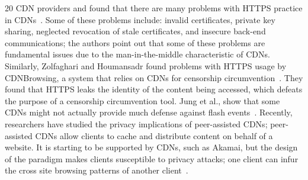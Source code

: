 20 CDN providers and found that there are many problems with HTTPS practice in CDNs~\cite{liang2014https}.  Some of these 
problems include: invalid certificates, private key sharing, neglected revocation of stale certificates, and 
insecure back-end communications; the authors point out that some of these problems are fundamental issues due to 
the man-in-the-middle characteristic of CDNs.  Similarly, Zolfaghari and Houmansadr found problems with HTTPS usage by 
CDNBrowsing, a system that relies on CDNs for censorship circumvention~\cite{zolfaghari2016practical}.  They found that HTTPS 
leaks the identity of the content being accessed, which defeats the purpose of a censorship circumvention tool. Jung et al., show 
that some CDNs might not actually provide much defense against flash events~\cite{jung2002flash}.  Recently, researchers have studied the privacy implications of peer-assisted CDNs; peer-assisted CDNs allow clients to cache and distribute 
content on behalf of a website.  It is starting to be supported by CDNs, such as Akamai, but the design of the paradigm
makes clients susceptible to privacy attacks; one client can infur the cross site browsing patterns of another client~\cite{jia2016anonymity}.


